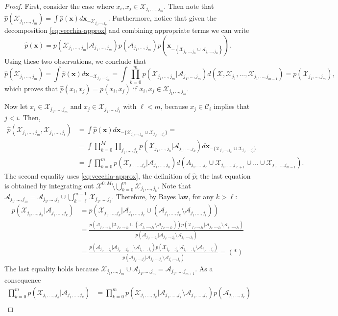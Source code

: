 \documentclass[12pt,letterpaper]{article}
\theoremstyle{propstyle}
\theoremstyle{propstyle}
\theoremstyle{propstyle}
\theoremstyle{propstyle}
\theoremstyle{propstyle}
\newcommand{\bx}{\mathbf{x}}
\newcommand{\sx}{\mathcal{X}}
\newcommand{\sa}{\mathcal{A}}
\newcommand{\condset}{\mathcal{C}}
\newcommand{\jm}{{j_1,\ldots,j_m}}
\newcommand{\jmp}{{j_1,\ldots,j_{m+1}}}
\newcommand{\jmm}{{j_1,\ldots,j_{m-1}}}
\newcommand{\jk}{{j_1,\ldots,j_k}}
\newcommand{\jkp}{{j_1,\ldots,j_{k+1}}}
\newcommand{\jl}{{j_1,\ldots,j_\ell}}
\newcommand{\jlp}{{j_1,\ldots,j_{\ell+1}}}
\newcommand{\knots}{\mathcal{K}}
\begin{document}
\begin{proof}
First, consider the case where $x_i, x_j \in \sx_\jm$. Then note that $\hat{p}(\sx_\jm) = \int \hat{p}(\bx) d\bx_{-\sx_\jm}$. Furthermore, notice that given the decomposition \eqref{eq:vecchia-approx} and combining appropriate terms we can write 
$$\hat{p}(\bx)=p\left(\sx_\jm|\sa_\jm\right)p\left(\sa_\jm\right)p\left(\bx_{-\left\{\sx_\jm\cup \sa_\jm\right\}}\right).$$
Using these two observations, we conclude that
$$ \textstyle \hat{p}(\sx_\jm) = \int \hat{p}(\bx) d\bx_{-\sx_\jm} = \int \prod_{k=0}^m p(\sx_\jm|\sa_\jm) d(\sx, \sx_{j_1}, \ldots, \sx_\jmm) = p(\sx_\jm),
$$
which proves that $\hat{p}(x_i, x_j)=p(x_i, x_j)$ if $x_i, x_j \in \sx_\jm$.

Now let $x_i \in \sx_\jm$ and $x_j \in \sx_\jl$ with $\ell < m$, because $x_j \in \condset_i$ implies that $j<i$.
Then,
\begin{align*}
\hat{p}(\sx_\jm, \sx_\jl) & \textstyle =\int \hat{p}(\bx) d\bx_{-\{\sx_\jm \cup \sx_\jl\}} = \\
   & \textstyle = \int \prod_{k=0}^M \prod_\jk p(\sx_\jk|\sa_\jk) d\bx_{-\{\sx_\jm \cup \sx_\jl\}} \\
   & \textstyle = \int \prod_{k=0}^m p(\sx_\jk|\sa_\jk) d(A_\jl\cup\sx_\jlp \cup \dots \cup \sx_\jmm).
\end{align*}
The second equality uses \eqref{eq:vecchia-approx}, the definition of $\hat{p}$; the last equation is obtained by integrating out $\sx^{0:M}\setminus \bigcup_{k=0}^m \sx_\jk$.
Note that $\sa_\jm = \sa_\jl \cup \bigcup_{k=\ell}^{m-1} \sx_\jk$. Therefore, by Bayes law, for any $k>\ell$:
\begin{align*}
    p(\sx_\jk|\sa_\jk) & \textstyle = p\left(\sx_\jk|\sa_\jl \cup (\sa_\jk\setminus \sa_\jl)\right) \\
   & \textstyle = \frac{p\left(\sa_\jl | \sx_\jk \cup (\sa_\jk\setminus \sa_\jl)\right)p(\sx_\jk|\sa_\jk\setminus\sa_\jl)}{p(\sa_\jl|\sa_\jk \setminus \sa_\jl)} \\ 
   & \textstyle =\frac{p(\sa_\jl|\sa_\jkp \setminus \sa_\jl)p(\sx_\jk|\sa_\jk\setminus \sa_\jl)}{p(\sa_\jl|\sa_\jk \setminus \sa_\jl)} = (*)
\end{align*}
The last equality holds because $\sx_\jm \cup \sa_\jm = \sa_\jmp$. As a consequence
\begin{align*}
    \textstyle \prod_{k=0}^m p(\sx_\jk|\sa_\jk) & \textstyle = \prod_{k=0}^m p(\sx_\jk|\sa_\jk\setminus \sa_\jl) p(\sa_\jl) \\

\end{align*}
\end{proof}
\end{document}
